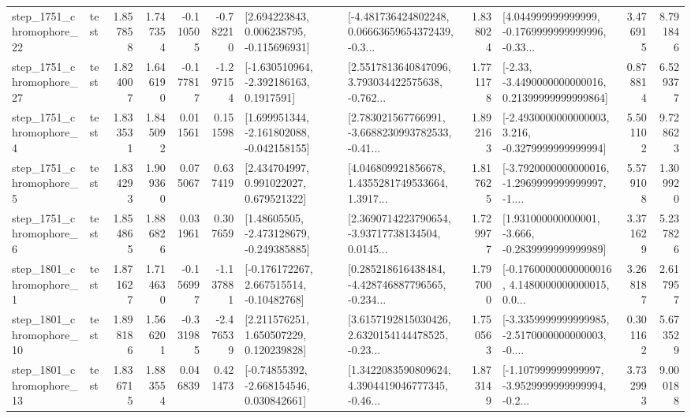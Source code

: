 \begin{tabular}{llrrrrllrlrr}
 step\_1751\_chromophore\_22 &      test &      1.857858 &    1.747354 &     -0.110505 & -0.782210 &    [2.694223843, 0.006238795, -0.115696931] &  [-4.481736424802248, 0.06663659654372439, -0.3... &       1.838024 &  [4.044999999999999, -0.1769999999999996, -0.33... &            3.476915 &          8.791846 \\
 step\_1751\_chromophore\_27 &      test &      1.824007 &    1.646190 &     -0.177817 & -1.297154 &     [-1.630510964, -2.392186163, 0.1917591] &  [2.5517813640847096, 3.793034422575638, -0.762... &       1.771178 &  [-2.33, -3.4490000000000016, 0.21399999999999864] &            0.878814 &          6.529377 \\
  step\_1751\_chromophore\_4 &      test &      1.833531 &    1.845092 &      0.011561 &  0.151598 &   [1.699951344, -2.161802088, -0.042158155] &  [2.783021567766991, -3.6688230993782533, -0.41... &       1.892163 &  [-2.4930000000000003, 3.216, -0.3279999999999994] &            5.501102 &          9.728623 \\
  step\_1751\_chromophore\_5 &      test &      1.834293 &    1.909360 &      0.075067 &  0.637419 &     [2.434704997, 0.991022027, 0.679521322] &  [4.046809921856678, 1.4355281749533664, 1.3917... &       1.817625 &  [-3.7920000000000016, -1.2969999999999997, -1.... &            5.579108 &          1.309920 \\
  step\_1751\_chromophore\_6 &      test &      1.854865 &    1.886826 &      0.031961 &  0.307659 &    [1.48605505, -2.473128679, -0.249385885] &  [2.3690714223790654, -3.93717738134504, 0.0145... &       1.729977 &   [1.931000000000001, -3.666, -0.2839999999999989] &            3.371629 &          5.237826 \\
  step\_1801\_chromophore\_1 &      test &      1.871627 &    1.714630 &     -0.156997 & -1.137881 &    [-0.176172267, 2.667515514, -0.10482768] &  [0.285218616438484, -4.428746887796565, -0.234... &       1.797000 &  [-0.17600000000000016, 4.1480000000000015, 0.0... &            3.268187 &          2.617957 \\
 step\_1801\_chromophore\_10 &      test &      1.898186 &    1.566201 &     -0.331985 & -2.476539 &     [2.211576251, 1.650507229, 0.120239828] &  [3.6157192815030426, 2.6320154144478525, -0.23... &       1.750563 &  [-3.3359999999999985, -2.5170000000000003, -0.... &            0.301162 &          5.673529 \\
 step\_1801\_chromophore\_13 &      test &      1.836715 &    1.883554 &      0.046839 &  0.421473 &    [-0.74855392, -2.668154546, 0.030842661] &  [1.3422083590809624, 4.3904419046777345, -0.46... &       1.873149 &  [-1.107999999999997, -3.9529999999999994, -0.2... &            3.732993 &          9.000188 \\

\end{tabular}
